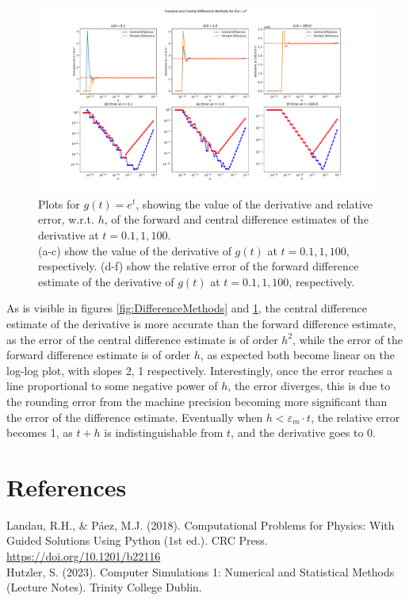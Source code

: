 \documentclass{article}
\theoremstyle{definition}
\theoremstyle{remark}
\begin{document}
\begin{figure}[H]
    \centering
    \includegraphics[width=1.2\textwidth]{DifferenceMethodsExp.pdf}
    \caption{\label{fig:DifferenceMethodsExp} Plots for $g(t) = e^t$, showing the value of the derivative and relative error, w.r.t. $h$, of the forward and central difference estimates of the derivative at $t=0.1, 1, 100$.\\
    \indent (a-c) show the value of the derivative of $g(t)$ at $t=0.1, 1, 100$, respectively. (d-f) show the relative error of the forward difference estimate of the derivative of $g(t)$ at $t=0.1, 1, 100$, respectively.}
\end{figure}
\indent As is visible in figures \ref{fig:DifferenceMethods} and \ref{fig:DifferenceMethodsExp}, the central difference estimate of the derivative is more accurate than the forward difference estimate, as the error of the central difference estimate is of order $h^2$, while the error of the forward difference estimate is of order $h$, as expected both become linear on the log-log plot, with slopes 2, 1 respectively. Interestingly, once the error reaches a line proportional to some negative power of $h$, the error diverges, this is due to the rounding error from the machine precision becoming more significant than the error of the difference estimate. Eventually when $h<\varepsilon_m\cdot t$, the relative error becomes 1, as $t+h$ is indistinguishable from $t$, and the derivative goes to 0.

\section{References}
    Landau, R.H., \& Páez, M.J. (2018). Computational Problems for Physics: With Guided Solutions Using Python (1st ed.). CRC Press. \url{https://doi.org/10.1201/b22116}\\
    Hutzler, S. (2023). Computer Simulations 1: Numerical and Statistical Methods (Lecture Notes). Trinity College Dublin.\\
\end{document}
